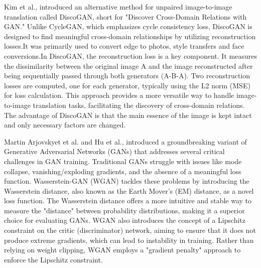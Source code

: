 \documentclass[12pt,a4paper]{article}
\begin{document}
Kim et al.\cite{kim2017}, introduced an alternative method for unpaired image-to-image translation called DiscoGAN, short for "Discover Cross-Domain Relations with GAN." Unlike CycleGAN, which emphasizes cycle consistency loss, DiscoGAN is designed to find meaningful cross-domain relationships by utilizing reconstruction losses.It was primarily used to convert edge to photos, style transfers and face conversions.In DiscoGAN, the reconstruction loss is a key component. It measures the dissimilarity between the original image A and the image reconstructed after being sequentially passed through both generators (A-B-A). Two reconstruction losses are computed, one for each generator, typically using the L2 norm (MSE) for loss calculation. This approach provides a more versatile way to handle image-to-image translation tasks, facilitating the discovery of cross-domain relations. The advantage of DiscoGAN is that the main essence of the image is kept intact and only necessary factors are changed.

Martin Arjovskyet et al. \cite{arjovsky2017} and Hu et al.\cite{hu2021}, introduced a groundbreaking variant of Generative Adversarial Networks (GANs) that addresses several critical challenges in GAN training. Traditional GANs struggle with issues like mode collapse, vanishing/exploding gradients, and the absence of a meaningful loss function. Wasserstein-GAN (WGAN) tackles these problems by introducing the Wasserstein distance, also known as the Earth Mover's (EM) distance, as a novel loss function. The Wasserstein distance offers a more intuitive and stable way to measure the "distance" between probability distributions, making it a superior choice for evaluating GANs. WGAN also introduces the concept of a Lipschitz constraint on the critic (discriminator) network, aiming to ensure that it does not produce extreme gradients, which can lead to instability in training. Rather than relying on weight clipping, WGAN employs a "gradient penalty" approach to enforce the Lipschitz constraint.
\end{document}
